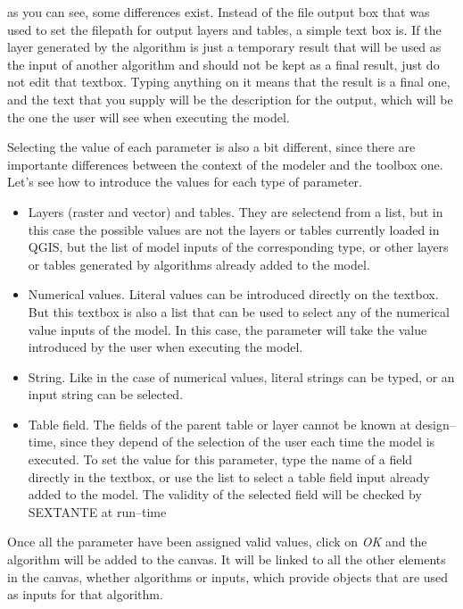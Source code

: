 as you can see, some differences exist. Instead of the file output box that was used to set the filepath for output layers and tables, a simple text box is. If the layer generated by the algorithm is just a temporary result that will be used as the input of another algorithm and should not be kept as a final result, just do not edit that textbox. Typing anything on it means that the result is a final one, and the text that you supply will be the description for the output, which will be the one the user will see when executing the model. 

Selecting the value of each parameter is also a bit different, since there are importante differences between the context of the modeler and the toolbox one. Let's see how to introduce the values for each type of parameter.
\begin{itemize}
	\item Layers (raster and vector) and tables. They are selectend from a list, but in this case the possible values are not the layers or tables currently loaded in QGIS, but the list of model inputs of the corresponding type, or other layers or tables generated by algorithms already added to the model.
	\item Numerical values. Literal values can be introduced directly on the textbox. But this textbox is also a list that can be used to select any of the numerical value inputs of the model. In this case, the parameter will take the value introduced by the user when executing the model. 
	\item String. Like in the case of numerical values, literal strings can be typed, or an input string can be selected.
	\item Table field. The fields of the parent table or layer cannot be known at design--time, since they depend of the selection of the user each time the model is executed. To set the value for this parameter, type the name of a field directly in the textbox, or use the list to select a table field input already added to the model. The validity of the selected field will be checked by SEXTANTE at run--time
\end{itemize}

Once all the parameter have been assigned valid values, click on \emph{OK} and the algorithm will be added to the canvas. It will be linked to all the other elements in the canvas, whether algorithms or inputs, which provide objects that are used as inputs for that algorithm.

